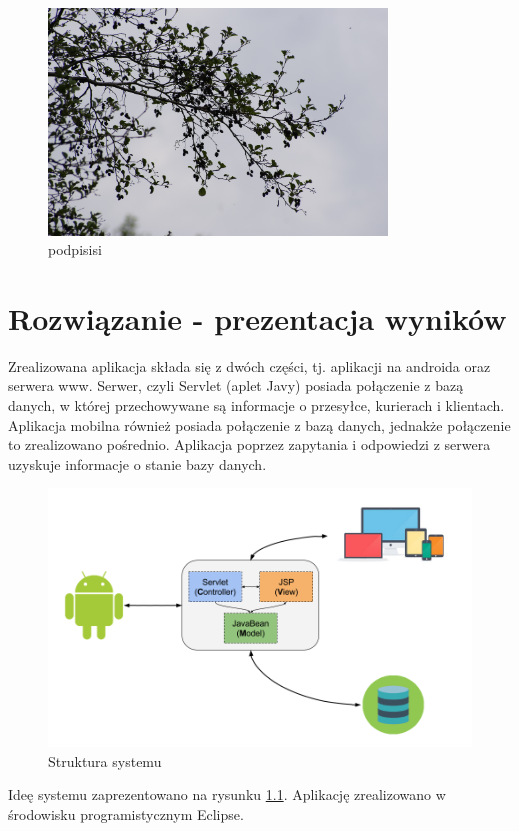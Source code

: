 \documentclass[eng,printmode,oneside]{mgr}
\begin{document}
\begin{figure}[ht!]
\centering
\includegraphics[width=90mm]{obr.jpg}
\caption{podpisisi}
\end{figure}

\chapter{Rozwiązanie - prezentacja wyników}

Zrealizowana aplikacja składa się z dwóch części, tj. aplikacji na androida oraz
serwera www. Serwer, czyli Servlet (aplet Javy) posiada połączenie z bazą
danych, w której przechowywane są informacje o przesyłce, kurierach i
klientach. Aplikacja mobilna również posiada połączenie z bazą danych, jednakże
połączenie to zrealizowano pośrednio. Aplikacja poprzez zapytania i odpowiedzi z
serwera uzyskuje informacje o stanie bazy danych. 

\begin{figure}[h]
\centering
\includegraphics[width=100ex]{StrukturaSystemu.png}
\caption{Struktura systemu}
\label{StrukturaSystemu}
\end{figure}

Ideę systemu zaprezentowano na rysunku \ref{StrukturaSystemu}.
Aplikację zrealizowano w środowisku programistycznym Eclipse.
\end{document}

